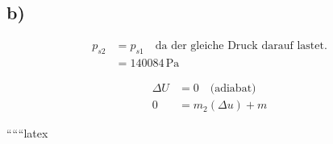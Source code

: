 

\subsection*{b)}

\begin{align*}
p_{s2} &= p_{s1} \quad \text{da der gleiche Druck darauf lastet.} \\
&= 140084 \, \text{Pa}
\end{align*}

\begin{align*}
\Delta U &= 0 \quad \text{(adiabat)} \\
0 &= m_2 (\Delta u) + m
\end{align*}

``````latex